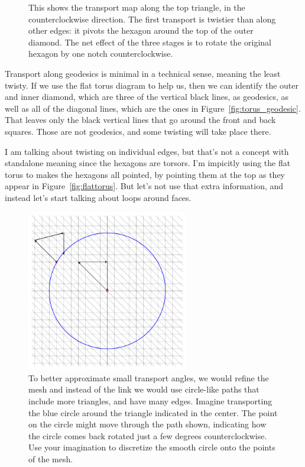 \begin{figure}[htbp]
\centering




\caption{This shows the transport map along the top triangle, in the counterclockwise direction. The first transport is twistier than along other edges: it pivots the hexagon around the top of the outer diamond. The net effect of the three stages is to rotate the original hexagon by one notch counterclockwise.}
\label{fig:torus_twist}
\end{figure}

Transport along geodesics is minimal in a technical sense, meaning the least twisty. If we use the flat torus diagram to help us, then we can identify the outer and inner diamond, which are three of the vertical black lines, as geodesics, as well as all of the diagonal lines, which are the ones in Figure~\ref{fig:torus_geodesic}. That leaves only the black vertical lines that go around the front and back squares. Those are not geodesics, and some twisting will take place there.

I am talking about twisting on individual edges, but that's not a concept with standalone meaning since the hexagons are torsors. I'm impicitly using the flat torus to makes the hexagons all pointed, by pointing them at the top as they appear in Figure~\ref{fig:flattorus}. But let's not use that extra information, and instead let's start talking about loops around faces.

\begin{figure}[htbp]
\centering
\includegraphics[width=200pt]{dense_circle.png}
\caption{To better approximate small transport angles, we would refine the mesh and instead of the link we would use circle-like paths that include more triangles, and have many edges. Imagine transporting the blue circle around the triangle indicated in the center. The point on the circle might move through the path shown, indicating how the circle comes back rotated just a few degrees counterclockwise. Use your imagination to discretize the smooth circle onto the points of the mesh.}
\label{fig:dense_circle}
\end{figure}



